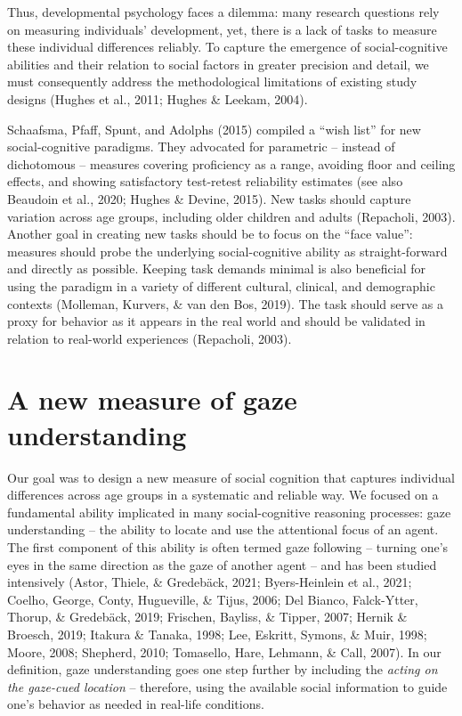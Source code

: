\documentclass[
  man,floatsintext]{apa7}
\begin{document}
Thus, developmental psychology faces a dilemma: many research questions rely on measuring individuals' development, yet, there is a lack of tasks to measure these individual differences reliably.
To capture the emergence of social-cognitive abilities and their relation to social factors in greater precision and detail, we must consequently address the methodological limitations of existing study designs (Hughes et al., 2011; Hughes \& Leekam, 2004).

Schaafsma, Pfaff, Spunt, and Adolphs (2015) compiled a ``wish list'' for new social-cognitive paradigms.
They advocated for parametric -- instead of dichotomous -- measures covering proficiency as a range, avoiding floor and ceiling effects, and showing satisfactory test-retest reliability estimates (see also Beaudoin et al., 2020; Hughes \& Devine, 2015).
New tasks should capture variation across age groups, including older children and adults (Repacholi, 2003).
Another goal in creating new tasks should be to focus on the ``face value'': measures should probe the underlying social-cognitive ability as straight-forward and directly as possible.
Keeping task demands minimal is also beneficial for using the paradigm in a variety of different cultural, clinical, and demographic contexts (Molleman, Kurvers, \& van den Bos, 2019).
The task should serve as a proxy for behavior as it appears in the real world and should be validated in relation to real-world experiences (Repacholi, 2003).

\hypertarget{a-new-measure-of-gaze-understanding}{%
\section{A new measure of gaze understanding}\label{a-new-measure-of-gaze-understanding}}

Our goal was to design a new measure of social cognition that captures individual differences across age groups in a systematic and reliable way.
We focused on a fundamental ability implicated in many social-cognitive reasoning processes: gaze understanding -- the ability to locate and use the attentional focus of an agent.
The first component of this ability is often termed gaze following -- turning one's eyes in the same direction as the gaze of another agent -- and has been studied intensively (Astor, Thiele, \& Gredebäck, 2021; Byers-Heinlein et al., 2021; Coelho, George, Conty, Hugueville, \& Tijus, 2006; Del Bianco, Falck-Ytter, Thorup, \& Gredebäck, 2019; Frischen, Bayliss, \& Tipper, 2007; Hernik \& Broesch, 2019; Itakura \& Tanaka, 1998; Lee, Eskritt, Symons, \& Muir, 1998; Moore, 2008; Shepherd, 2010; Tomasello, Hare, Lehmann, \& Call, 2007).
In our definition, gaze understanding goes one step further by including the \emph{acting on the gaze-cued location} -- therefore, using the available social information to guide one's behavior as needed in real-life conditions.
\end{document}
